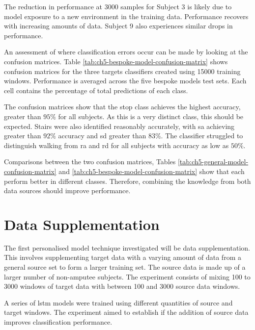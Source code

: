 The reduction in performance at 3000 samples for Subject 3 is likely due to model exposure to a new environment in the training data. Performance recovers with increasing amounts of data. Subject 9 also experiences similar drops in performance.

An assessment of where classification errors occur can be made by looking at the confusion matrices. Table \ref{tab:ch5-bespoke-model-confusion-matrix} shows confusion matrices for the three targets classifiers created using 15000 training windows. Performance is averaged across the five bespoke models test sets. Each cell contains the percentage of total predictions of each class.

The confusion matrices show that the stop class achieves the highest accuracy, greater than $95\%$ for all subjects. As this is a very distinct class, this should be expected. Stairs were also identified reasonably accurately, with \acrlong{sa} achieving greater than $92\%$ accuracy and \acrlong{sd} greater than $83\%$. The classifier struggled to distinguish walking from \acrlong{ra} and \acrlong{rd} for all subjects with accuracy as low as $50\%$. 

Comparisons between the two confusion matrices, Tables \ref{tab:ch5-general-model-confusion-matrix} and \ref{tab:ch5-bespoke-model-confusion-matrix} show that each perform better in different classes. Therefore, combining the knowledge from both data sources should improve performance.


\section{Data Supplementation}
\label{sec:model-personalisation-results-supplementation}
The first personalised model technique investigated will be data supplementation. This involves supplementing target data with a varying amount of data from a general source set to form a larger training set. The source data is made up of a larger number of non-amputee subjects. The experiment consists of mixing 100 to 3000 windows of target data with between 100 and 3000 source data windows.

A series of \acrshort{lstm} models were trained using different quantities of source and target windows. The experiment aimed to establish if the addition of source data improves classification performance.

